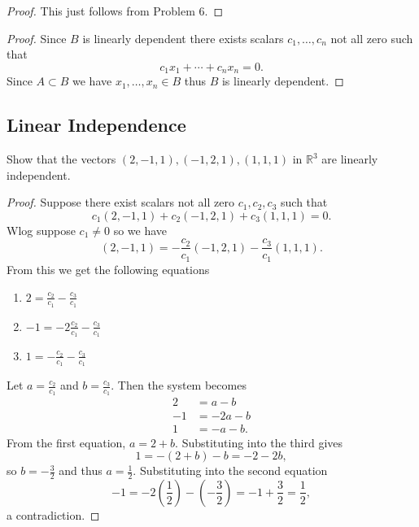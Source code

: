 \begin{proof}
    This just follows from Problem 6.
\end{proof}

\begin{proof}
    Since $B$ is linearly dependent there exists scalars $c_1, \ldots, c_n$ not all zero such that 
    \[c_1 x_1 + \cdots + c_n x_n = 0.\]
    Since $A \subset B$ we have $x_1, \ldots, x_n \in B$ thus $B$ is linearly dependent.
\end{proof}

\subsection{Linear Independence}

\begin{tcolorbox}[title=Problem 1, breakable]
    Show that the vectors $(2, -1, 1), (-1, 2, 1), (1, 1, 1)$
    in $\mathbb{R}^3$ are linearly independent.
\end{tcolorbox}

\begin{proof}
    Suppose there exist scalars not all zero $c_1, c_2, c_3$ such that 
    \[c_1 (2, -1, 1) + c_2 (-1, 2, 1) + c_3 (1, 1, 1) = 0.\]
    Wlog suppose $c_1 \ne 0$ so we have 
    \[(2, -1, 1) = -\frac{c_2}{c_1} (-1, 2, 1) - \frac{c_3}{c_1}(1, 1, 1).\]
    From this we get the following equations
    \begin{enumerate}
        \item $2 = \frac{c_2}{c_1} - \frac{c_3}{c_1}$
        \item $-1 = -2\frac{c_2}{c_1} - \frac{c_3}{c_1}$
        \item $1 = -\frac{c_2}{c_1} - \frac{c_3}{c_1}$
    \end{enumerate}
    Let $a = \frac{c_2}{c_1}$ and $b = \frac{c_3}{c_1}$. Then the system becomes
    \begin{align*}
        2 &= a - b \\
        -1 &= -2a - b \\
        1 &= -a - b.
    \end{align*}
    From the first equation, $a = 2 + b$. Substituting into the third gives
    \[
        1 = -(2 + b) - b = -2 - 2b,
    \]
    so $b = -\frac{3}{2}$ and thus $a = \frac{1}{2}$. Substituting into the second equation
    \[
        -1 = -2\left(\frac{1}{2}\right) - \left(-\frac{3}{2}\right) = -1 + \frac{3}{2} = \frac{1}{2},
    \]
    a contradiction.
\end{proof}

